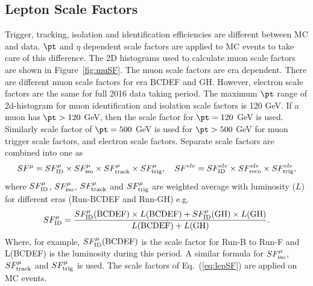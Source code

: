 \subsection{Lepton Scale Factors}
\label{s:lepton_sf}
Trigger, tracking, isolation and identification efficiencies are different between MC and data.
$\pt$ and $\eta$ dependent scale factors are applied to MC events to take care of this difference.
The 2D histograms used to calculate muon scale factors are shown in Figure~\ref{fig:muSF}.
The muon scale factors are era dependent. There are different muon scale factors for era 
BCDEF and GH. However, electron scale factors are the same for full 2016 data taking period.
The maximum $\pt$ range of 2d-histogram for muon identification and isolation scale factors
is 120 GeV. If a muon has $\pt > 120$ GeV, then the scale factor for $\pt = 120$ GeV is
used. Similarly scale factor of $\pt = 500$ GeV is used for $\pt > 500$
GeV for muon trigger scale factors, and electron scale factors. Separate scale 
factors are combined into one as
\begin{equation}
 SF^\mu = SF^\mu_{\rm ID}\times SF^\mu_{\rm iso}\times SF^\mu_{\rm track}\times SF^\mu_{\rm trig}, \quad
 SF^{ele} = SF^{ele}_{\rm ID}\times SF^{ele}_{\rm reco}\times SF^{ele}_{\rm trig},
\label{eq:lepSF}
\end{equation}
where $SF^\mu_{\rm ID}$, $SF^\mu_{\rm iso}$, $SF^\mu_{\rm track}$ and $SF^\mu_{\rm trig}$ are weighted
average with luminosity ($L$) for different eras (Run-BCDEF and Run-GH) e.g. 
\begin{equation}
 SF^\mu_{\rm ID}=\frac{SF^\mu_{\rm ID}({\rm BCDEF})\times L({\rm BCDEF})+SF^\mu_{\rm ID}({\rm GH})\times L({\rm GH})}
 {L({\rm BCDEF})+L({\rm GH})}.
\end{equation}
Where, for example, $SF^\mu_{\rm ID}({\rm BCDEF})$ is the scale factor for 
Run-B to Run-F and L({\rm BCDEF})
is the luminosity during this period. A similar formula for $SF^\mu_{\rm iso}$, 
$SF^\mu_{\rm track}$ and $SF^\mu_{\rm trig}$ is used. The scale factors of 
Eq.~(\ref{eq:lepSF}) are applied on MC events.
